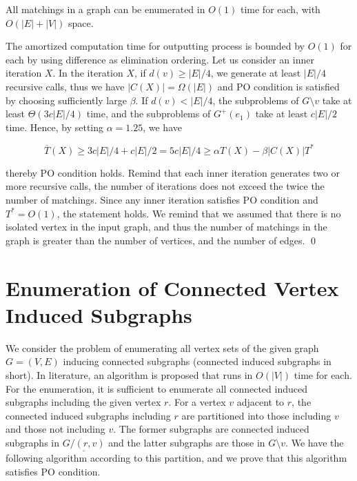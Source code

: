 \documentclass{llncs}
\begin{document}
\begin{theorem}\label{match}
All matchings in a graph can be enumerated in $O(1)$ time for each,
 with $O(|E|+|V|)$ space.
\end{theorem}

\proof
The amortized computation time for outputting process is
 bounded by $O(1)$ for each by using difference as elimination ordering.
Let us consider an inner iteration $X$.
In the iteration $X$, if $d(v)\ge |E|/4$, we generate at least $|E|/4$
 recursive calls, thus we have $|C(X)|=\Omega(|E|)$ and PO
 condition is satisfied by choosing sufficiently large $\beta$.
If $d(v) < |E|/4$, the subproblems of $G\setminus v$ take 
 at least $\Theta(3c|E|/4)$ time, and the subproblems of $G^+(e_1)$
 take at least $c|E|/2$ time.
Hence, by setting $\alpha = 1.25$, we have 

\vspace{-1mm}
\[ \overline{T}(X) \ge 3c|E|/4 + c|E|/2 = 5c|E|/4 \ge \alpha T(X) - \beta |C(X)|T^* \] 
\vspace{-3mm}

\noindent
 thereby PO condition holds.
Remind that each inner iteration generates two or more recursive calls, 
 the number of iterations does not exceed the twice the number of matchings.
Since any inner iteration satisfies PO condition and
 $T^* = O(1)$, the statement holds.
We remind that we assumed that there is no isolated vertex in the
 input graph, and thus the number of matchings in the graph is 
 greater than the number of vertices, and the number of edges.
\qed 


\vspace{-2mm}
\section{Enumeration of Connected Vertex Induced Subgraphs}\label{sec:CIS}
\vspace{-2mm}

We consider the problem of enumerating all vertex sets of the given graph $G=(V,E)$ inducing connected subgraphs (connected induced subgraphs in short).
In literature, an algorithm is proposed that runs in $O(|V|)$ time for
 each\cite{AvFk96}.
For the enumeration, it is sufficient to enumerate all connected 
 induced subgraphs including the given vertex $r$.
For a vertex $v$ adjacent to $r$, the connected induced subgraphs
 including $r$ are partitioned into those including $v$ and
 those not including $v$.
The former subgraphs are connected induced subgraphs in 
 $\underline{G/(r,v)}$ and the latter subgraphs are those in $G\setminus v$.
We have the following algorithm according to this partition, and we 
 prove that this algorithm satisfies PO condition.
\end{document}
